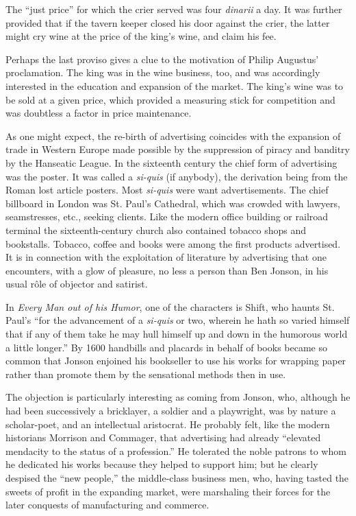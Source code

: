 \documentclass[openany,nobib]{tufte-book}
\begin{document}
The ``just price'' for which the crier served was four \emph{dinarii} a
day. It was further provided that if the tavern keeper closed his door
against the crier, the latter might cry wine at the price of the king's
wine, and claim his fee.

Perhaps the last proviso gives a clue to the motivation of Philip
Augustus' proclamation. The king was in the wine business, too, and was
accordingly interested in the education and expansion of the market. The
king's wine was to be sold at a given price, which provided a measuring
stick for competition and was doubtless a factor in price maintenance.

As one might expect, the re-birth of advertising coincides with the
expansion of trade in Western Europe made possible by the suppression of
piracy and banditry by the Hanseatic League. In the sixteenth century
the chief form of advertising was the poster. It was called a
\emph{si-quis} (if anybody), the derivation being from the Roman lost
article posters. Most \emph{si-quis} were want advertisements. The chief
billboard in London was St. Paul's Cathedral, which was crowded with
lawyers, seamstresses, etc., seeking clients. Like the modern office
building or railroad terminal the sixteenth-century church also
contained tobacco shops and bookstalls. Tobacco, coffee and books were
among the first products advertised. It is in connection with the
exploitation of literature by advertising that one encounters, with a
glow of pleasure, no less a person than Ben Jonson, in his usual r\^ole of
objector and satirist.

In \emph{Every Man out of his Humor}, one of the characters is Shift,
who haunts St. Paul's ``for the advancement of a \emph{si-quis} or two,
wherein he hath so varied himself that if any of them take he may hull
himself up and down in the humorous world a little longer.'' By 1600
handbills and placards in behalf of books became so common that Jonson
enjoined his bookseller to use his works for wrapping paper rather than
promote them by the sensational methods then in use.

The objection is particularly interesting as coming from Jonson, who,
although he had been successively a bricklayer, a soldier and a
playwright, was by nature a scholar-poet, and an intellectual
aristocrat. He probably felt, like the modern historians Morrison and
Commager, that advertising had already ``elevated mendacity to the
status of a profession.'' He tolerated the noble patrons to whom he
dedicated his works because they helped to support him; but he clearly
despised the ``new people,'' the middle-class business men, who, having
tasted the sweets of profit in the expanding market, were marshaling
their forces for the later conquests of manufacturing and commerce.
\end{document}
